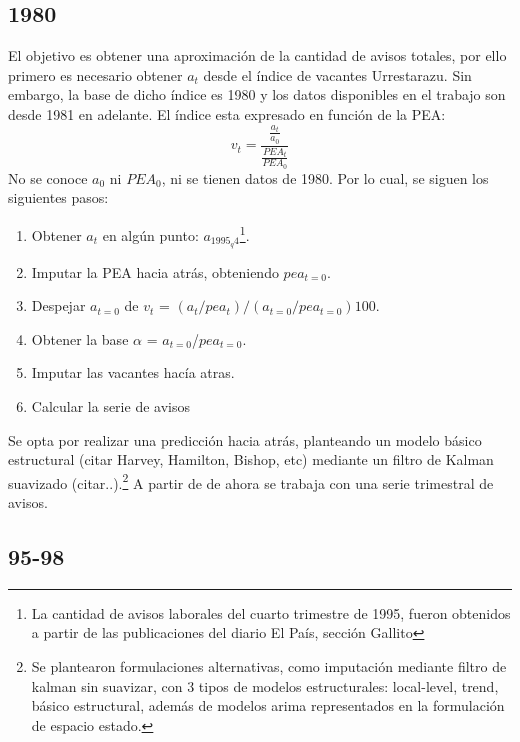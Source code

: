 \documentclass[12pt,twoside]{reedthesis}
\providecommand{\tightlist}{%
  \setlength{\itemsep}{0pt}\setlength{\parskip}{0pt}}
\begin{document}
\hypertarget{section}{%
\subsection{1980}\label{section}}

El objetivo es obtener una aproximación de la cantidad de avisos totales, por ello primero es necesario obtener \(a_t\) desde el índice de vacantes Urrestarazu. Sin embargo, la base de dicho índice es 1980 y los datos disponibles en el trabajo son desde 1981 en adelante. El índice esta expresado en función de la PEA:
\begin{equation}
v_t = \frac{\frac{a_t}{a_0}}{\frac{PEA_t}{PEA_0}}
\end{equation}
No se conoce \(a_0\) ni \(PEA_0\), ni se tienen datos de 1980. Por lo cual, se siguen los siguientes pasos:
\begin{enumerate}
\def\labelenumi{\arabic{enumi}.}
\tightlist
\item
  Obtener \(a_t\) en algún punto: \(a_{1995_q4}\)\footnote{La cantidad de avisos laborales del cuarto trimestre de 1995, fueron obtenidos a partir de las publicaciones del diario El País, sección Gallito}.
\item
  Imputar la PEA hacia atrás, obteniendo \(pea_{t=0}\).
\item
  Despejar \(a_{t=0}\) de
  \(v_t\) = \((a_t/pea_t)/(a_{t=0}/pea_{t=0})100\).
\item
  Obtener la base \(\alpha\) = \(a_{t=0}\)/\(pea_{t=0}\).
\item
  Imputar las vacantes hacía atras.
\item
  Calcular la serie de avisos
\end{enumerate}
Se opta por realizar una predicción hacia atrás, planteando un modelo básico estructural (citar Harvey, Hamilton, Bishop, etc) mediante un filtro de Kalman suavizado (citar..).\footnote{Se plantearon formulaciones alternativas, como imputación mediante filtro de kalman sin suavizar, con 3 tipos de modelos estructurales: local-level, trend, básico estructural, además de modelos arima representados en la formulación de espacio estado.} A partir de de ahora se trabaja con una serie trimestral de avisos.

\hypertarget{section-1}{%
\subsection{95-98}\label{section-1}}
\end{document}

